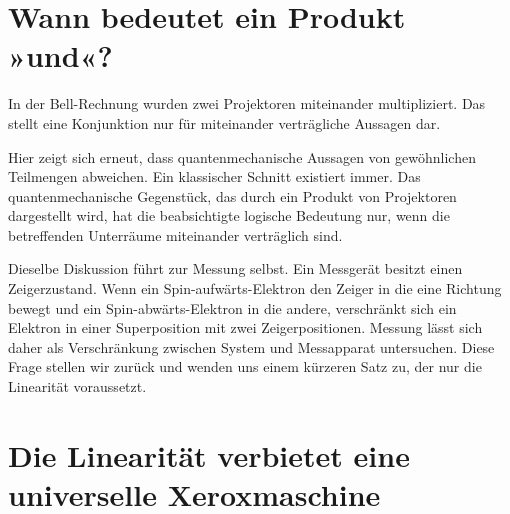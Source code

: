 \section{Wann bedeutet ein Produkt »und«?}

In der Bell-Rechnung wurden zwei Projektoren miteinander multipliziert. Das stellt eine Konjunktion nur für miteinander verträgliche Aussagen dar.

\begin{classroomqa}
\end{classroomqa}

Hier zeigt sich erneut, dass quantenmechanische Aussagen von gewöhnlichen Teilmengen abweichen. Ein klassischer Schnitt existiert immer. Das quantenmechanische Gegenstück, das durch ein Produkt von Projektoren dargestellt wird, hat die beabsichtigte logische Bedeutung nur, wenn die betreffenden Unterräume miteinander verträglich sind.

Dieselbe Diskussion führt zur Messung selbst. Ein Messgerät besitzt einen Zeigerzustand. Wenn ein Spin-aufwärts-Elektron den Zeiger in die eine Richtung bewegt und ein Spin-abwärts-Elektron in die andere, verschränkt sich ein Elektron in einer Superposition mit zwei Zeigerpositionen. Messung lässt sich daher als Verschränkung zwischen System und Messapparat untersuchen. Diese Frage stellen wir zurück und wenden uns einem kürzeren Satz zu, der nur die Linearität voraussetzt.

\begin{classroomqa}
\end{classroomqa}

\section{Die Linearität verbietet eine universelle Xeroxmaschine}

